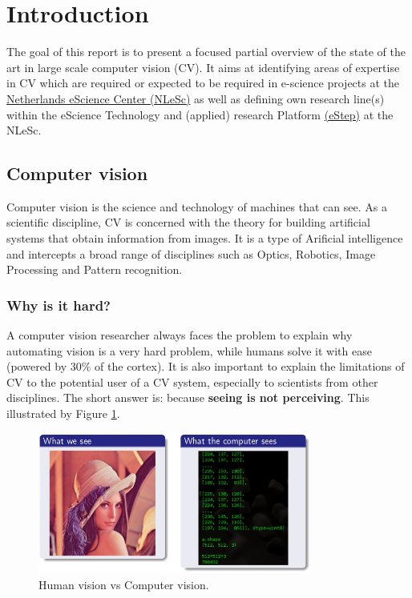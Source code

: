 \section{Introduction}
\label{sec:intro}
  
The goal of this report is to present a focused partial overview of the state of the art in large scale computer vision (CV).  It aims at identifying areas of expertise in CV which are required or expected to be required in e-science projects at the \href{https://www.esciencecenter.nl/}{Netherlands eScience Center (NLeSc)} as well as defining own research line(s) within the eScience Technology and (applied) research Platform \href{https://www.esciencecenter.nl/site/project/estep}{(eStep)} at the NLeSc.

\subsection{Computer vision}

Computer vision is the science and technology of machines that can see. As a scientific discipline, CV is concerned with the theory for building artificial systems that obtain information from images. It is a type of Arificial intelligence and intercepts a broad range of disciplines such as Optics, Robotics, Image Processing and Pattern recognition. 

\subsubsection{Why is it hard?}
A computer vision researcher always faces the problem to explain why automating vision is a very hard problem, while humans solve it with ease (powered by $30\%$ of the cortex). It is also important to explain the limitations of CV to the potential user of a CV system, especially to scientists from other disciplines. The short answer is: because {\bf seeing is not perceiving}. This illustrated by Figure \ref{fig:CV}.
\begin{figure}[H]
\begin{center}
\includegraphics[width=0.8\textwidth]{fig/ManVsPC}
\end{center}
\caption{Human vision vs Computer vision.}
\label{fig:CV}
\end{figure}

